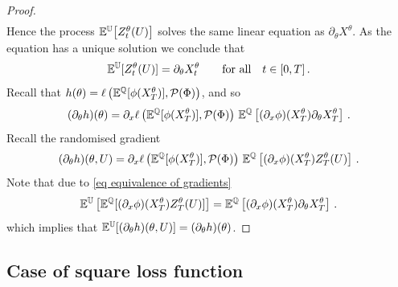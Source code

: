 \begin{proof}
\[\begin{split}
\end{split}
\]
Hence the process $\mathbb{E}^{\mathbb{U}} \big[Z_t^{\theta}(U)\big]$ solves the same linear equation as $\partial_\theta X^\theta$. 
As the equation has a unique solution we conclude that  
\begin{equation}\label{eq equivalence of gradients}
\mathbb{E}^{\mathbb{U}}[ Z_t^{\theta}(U) ] = \partial_\theta X_t^{\theta} \qquad \textup{for all} \quad t \in [0,T]\,.
\end{equation}
Recall that
$
h(\theta)= \ell\left(\mathbb{E}^{\mathbb{Q}}[\phi(X_T^{\theta})], \mathcal{P}(\Phi)\right)
$,
and so
\[
(\partial_\theta h)(\theta) = \partial_x \ell \left(\mathbb{E}^{\mathbb{Q}}[\phi(X_T^{\theta})] ,\mathcal{P}(\Phi)\right) \,\mathbb{E}^{ \mathbb{Q}}\left[(\partial_x\phi)( X_T^{\theta})\partial_\theta X_T^{\theta}\right]\,.
\]
Recall the randomised gradient 
\[
(\partial_\theta h)(\theta,U) =  \partial_x \ell  \left(\mathbb{E}^{\mathbb{Q}}[\phi(X_T^{\theta})] ,\mathcal{P}(\Phi)\right) \,\mathbb{E}^{ \mathbb{Q}}\left[(\partial_x\phi)( X_T^{\theta})Z_T^{\theta}(U) \right]\,.
\]
Note that due to \eqref{eq equivalence of gradients} 
\[
\mathbb{E}^{\mathbb{U}}\left[\mathbb{E}^{ \mathbb{Q}}[(\partial_x\phi)( X_T^{\theta})Z_T^{\theta}(U) ]\right] 
 =\mathbb{E}^{ \mathbb{Q}}\left[(\partial_x\phi)( X_T^{\theta})\partial_\theta X_T^{\theta}\right]\,.
\]
which implies that $\mathbb{E}^{\mathbb{U}}[(\partial_\theta h)(\theta,U)] = (\partial_\theta h)(\theta) $. 
\end{proof}



\subsection{Case of square loss function}\label{sec unbiased error}

